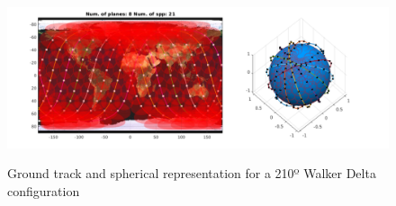 \begin{figure}[H] %
	\centering
	\includegraphics[width=.8\textwidth]{./testing/WB210.png}\\
	\caption[Ground track and spherical representation for a 210º Walker Delta]{Ground track and spherical representation for a 210º Walker Delta configuration}
	\label{fig:gt210}
\end{figure}